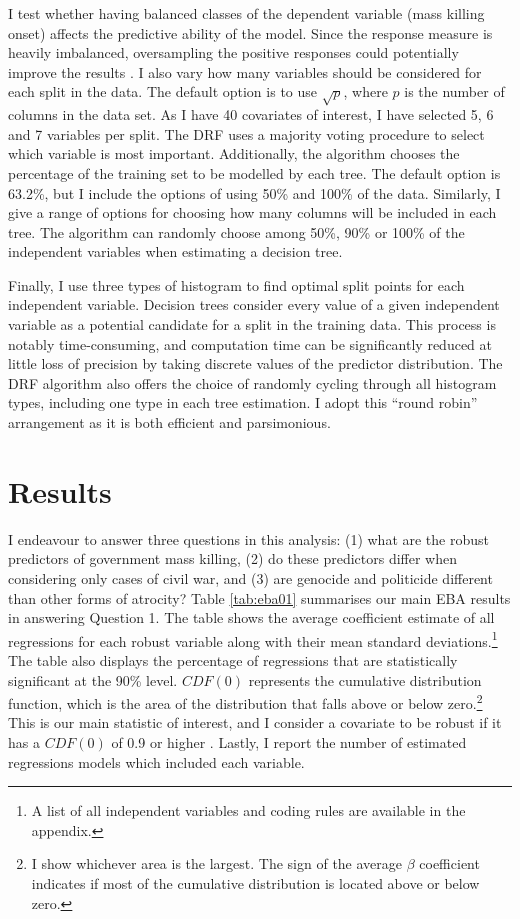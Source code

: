 \documentclass[a4paper,12pt]{article}
\begin{document}
I test whether having balanced classes of the dependent variable (mass killing onset) affects the predictive ability of the model. Since the response measure is heavily imbalanced, oversampling the positive responses could potentially improve the results \citep{chawla2004special,del2014use,japkowicz2002class}. 
I also vary how many variables should be considered for each split in the data. The default option is to use $\sqrt{p}$, where $p$ is the number of columns in the data set. As I have 40 covariates of interest, I have selected 5, 6 and 7 variables per split. The DRF uses a majority voting procedure to select which variable is most important. Additionally, the algorithm chooses the percentage of the training set to be modelled by each tree. The default option is 63.2\%, but I include the options of using 50\% and 100\% of the data. Similarly, I give a range of options for choosing how many columns will be included in each tree. The algorithm can randomly choose among 50\%, 90\% or 100\% of the independent variables when estimating a decision tree.

Finally, I use three types of histogram to find optimal split points for each independent variable. Decision trees consider every value of a given independent variable as a potential candidate for a split in the training data. This process is notably time-consuming, and computation time can be significantly reduced at little loss of precision by taking discrete values of the predictor distribution. The DRF algorithm also offers the choice of randomly cycling through all histogram types, including one type in each tree estimation. I adopt this ``round robin'' arrangement as it is both efficient and parsimonious.
	
\section{Results}
\label{sec:results}
	
I endeavour to answer three questions in this analysis: (1) what are the robust predictors of government mass killing, (2) do these predictors differ when considering only cases of civil war, and (3) are genocide and politicide different than other forms of atrocity? Table \ref{tab:eba01} summarises our main EBA results in answering Question 1. The table shows the average coefficient estimate of all regressions for each robust variable along with their mean standard deviations.\footnote{A list of all independent variables and coding rules are available in the appendix.} The table also displays the percentage of regressions that are statistically significant at the 90\% level. $CDF(0)$ represents the cumulative distribution function, which is the area of the distribution that falls above or below zero.\footnote{I show whichever area is the largest. The sign of the average $\beta$ coefficient indicates if most of the cumulative distribution is located above or below zero.} This is our main statistic of interest, and I consider a covariate to be robust if it has a $CDF(0)$ of 0.9 or higher \citep[181]{sala1997just}. Lastly, I report the number of estimated regressions models which included each variable.
\end{document}
